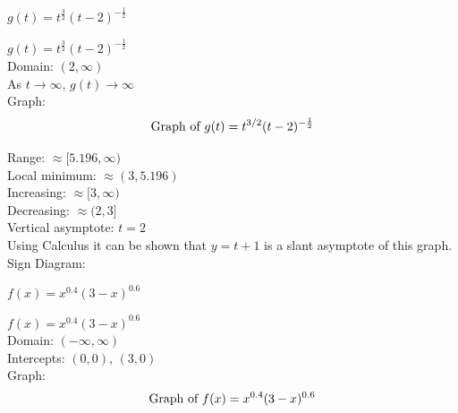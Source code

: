 \documentclass{ximera}
\begin{document}
\begin{question}
\begin{problem} $g(t) = t^{\frac{3}{2}}(t-2)^{-\frac{1}{2}}$ 

\begin{solution}
$g(t)= t^{\frac{3}{2}}(t-2)^{-\frac{1}{2}}$\\
Domain:  $(2, \infty)$\\
As $t \rightarrow \infty$, $g(t) \rightarrow \infty$\\
Graph: \\

$$\text{Graph of $g(t)=t^{3/2}(t-2)^{-\frac{1}{2}}$}$$

Range:  $\approx [5.196, \infty)$\\
Local minimum:  $\approx (3, 5.196)$\\
Increasing: $\approx [3, \infty)$\\
Decreasing: $\approx (2,3]$\\
Vertical asymptote:  $t = 2$\\
Using Calculus it can be shown that $y = t+1$ is a slant asymptote of this graph.\\
Sign Diagram:\\
\begin{image}
\end{image}
\end{solution}
\end{problem}

\begin{problem} $f(x) = x^{0.4} (3-x)^{0.6}$  

\begin{solution}
$f(x) = x^{0.4}(3-x)^{0.6}$ \\
 Domain: $(-\infty,  \infty)$\\
Intercepts: $(0,0)$, $(3,0)$\\
Graph: \\

$$\text{Graph of $f(x) = x^{0.4}(3-x)^{0.6}$}$$


\end{solution}
\end{problem}
\end{question}
\end{document}

